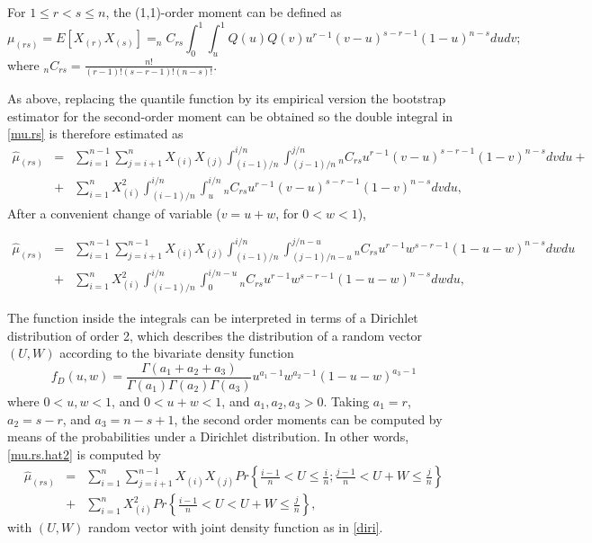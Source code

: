 \documentclass[preprint,12pt]{elsarticle}
\begin{document}
\bigskip
For $1 \leq r < s \leq n$, the (1,1)-order moment can be defined as 
\begin{equation}\label{mu.rs}
\mu_{(rs)}=E\left[X_{(r)}X_{(s)}\right]= _nC_{rs} \int_0^1\int_u^{1} Q(u)Q(v) u^{r-1}(v-u)^{s-r-1}(1-u)^{n-s}dudv;
\end{equation}
where $_nC_{rs}=\frac{n!}{(r-1)!(s-r-1)!(n-s)!}$.


As above, replacing the quantile function by its empirical version the bootstrap estimator for the second-order moment can be obtained so the double integral in \eqref{mu.rs} is therefore estimated as
\begin{eqnarray}\label{mu.rs.hat1}
\nonumber \widehat{\mu}_{(rs)}&=& \sum_{i=1}^{n-1}\sum_{j=i+1}^{n} X_{(i)}X_{(j)} \int_{(i-1)/n}^{i/n} \int_{(j-1)/n}^{j/n}{_n}C_{rs}  u^{r-1}(v-u)^{s-r-1}(1-v)^{n-s}dvdu +\\
&+&  \sum_{i=1}^n X_{(i)}^2\int_{(i-1)/n}^{i/n}\int_{u}^{i/n} {_n}C_{rs} u^{r-1}(v-u)^{s-r-1}(1-v)^{n-s}dvdu,
\end{eqnarray}
After a convenient change of variable  ($v=u+w$, for $0<w<1$), 

\begin{eqnarray}\label{mu.rs.hat2}
\nonumber \widehat{\mu}_{(rs)}&=& \sum_{i=1}^{n-1} \sum_{j=i+1}^{n-1} X_{(i)}X_{(j)} \int_{(i-1)/n}^{i/n}\int_{(j-1)/n-u}^{j/n-u}{_n}C_{rs}  u^{r-1}w^{s-r-1}(1-u-w)^{n-s}dwdu \\
&+&  \sum_{i=1}^n X_{(i)}^2\int_{(i-1)/n}^{i/n}\int_{0}^{i/n-u} {_n}C_{rs} u^{r-1}w^{s-r-1}(1-u-w)^{n-s}dwdu,
\end{eqnarray}



The function inside the integrals can be interpreted in terms  of a Dirichlet distribution of order 2, which describes the distribution of a random vector $(U,W)$ according to the  bivariate density function
\begin{equation}\label{diri}
f_D(u,w)=\frac{\Gamma(a_1+a_2+a_3)}{\Gamma(a_1)\Gamma(a_2)\Gamma(a_3)}u^{a_1-1}w^{a_2-1}(1-u-w)^{a_3-1}
\end{equation}
where $0<u,w<1$, and $0<u+w<1$, and $a_1, a_2, a_3 >0$. Taking $a_1=r$, $a_2=s-r$, and $a_3=n-s+1$, the second order moments can be computed by means of the probabilities  under a Dirichlet distribution. In other words, \eqref{mu.rs.hat2} is computed by 
\begin{eqnarray}\label{mu.rs.hat3}
\nonumber \widehat{\mu}_{(rs)}&=& \sum_{i=1}^{n} \sum_{j=i+1}^{n-1} X_{(i)}X_{(j)} Pr\left\{\frac{i-1}{n} < U \leq \frac{i}{n};\frac{j-1}{n} < U+W \leq \frac{j}{n} \right\}\\
&+&  \sum_{i=1}^n X_{(i)}^2 Pr\left\{\frac{i-1}{n} < U < U+W \leq \frac{j}{n} \right\},
\end{eqnarray}
with $(U,W)$ random vector with joint density function as in \eqref{diri}.
\end{document}
